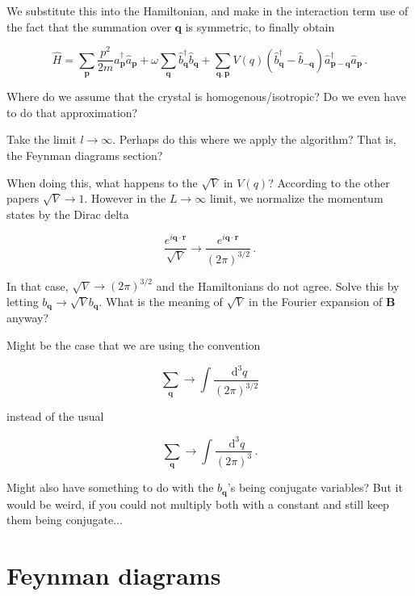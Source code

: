 \documentclass[12pt]{report}
\renewcommand{\vec}[1]{\boldsymbol{\mathbf{#1}}}                        %
\newcommand*\diff{\mathop{}\!\mathrm{d}}
\newcommand{\motivation}[1]{{\leavevmode\color{motivation}#1}}
\newcommand{\question}[1]{{\leavevmode\color{question}#1}}
\newcommand{\todo}[1]{{\leavevmode\color{todo}#1}}
\begin{document}
We substitute this into the Hamiltonian, and make in the interaction term use of the fact that the summation over $ \vec q $ is symmetric, to finally obtain

\begin{equation}
	\hat H
	= \sum_{\vec p} \frac{p^2}{2m} \hat a^\dagger_{\vec p} \hat a_{\vec p}
	+ \omega \sum_{\vec q} \hat b^\dagger_{\vec q} \hat b_{\vec q}
	+  \sum_{\vec q, \vec p} V (q) \left( \hat b^\dagger_{\vec q} - \hat b_{- \vec q} \right) \hat a^\dagger_{\vec p - \vec q} \hat a_{\vec p} \,.
\end{equation}

\question{Where do we assume that the crystal is homogenous/isotropic? Do we even have to do that approximation?}

\todo{Take the limit $ l \rightarrow \infty $. Perhaps do this where we apply the algorithm? That is, the Feynman diagrams section?}
\question{When doing this, what happens to the $ \sqrt V $ in $ V(q) $? According to the other papers $ \sqrt{V} \rightarrow 1 $. However in the $ L \rightarrow \infty $ limit, we normalize the momentum states by the Dirac delta

\begin{equation}
	\frac{e^{i \vec q \cdot \vec r}}{\sqrt V} \rightarrow \frac{e^{i \vec q \cdot \vec r}}{(2 \pi)^{3/2}} \,.
\end{equation}

In that case, $ \sqrt V \rightarrow (2 \pi)^{3/2} $ and the Hamiltonians do not agree. Solve this by letting $ b_{\vec q} \rightarrow \sqrt{V} b_{\vec q} $. What is the meaning of $ \sqrt{V} $ in the Fourier expansion of $ \vec B $ anyway?
}
\motivation{Might be the case that we are using the convention

\begin{equation}
	\sum_{\vec q} \rightarrow \int \frac{\diff^3 q}{(2 \pi)^{3/2}}
\end{equation}

instead of the usual

\begin{equation}
	\sum_{\vec q} \rightarrow \int \frac{\diff^3 q}{(2 \pi)^3} \,.
\end{equation}
}
\question{Might also have something to do with the $ b_{\vec q} $'s being conjugate variables? But it would be weird, if you could not multiply both with a constant and still keep them being conjugate...}




\section{Feynman diagrams}
\end{document}

